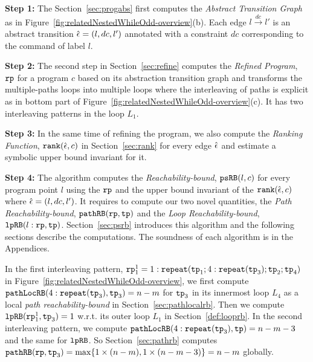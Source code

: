 \textbf{Step 1: }
The Section~\ref{sec:progabs} first 
computes the \emph{Abstract Transition Graph} as in Figure~\ref{fig:relatedNestedWhileOdd-overview}(b).
Each edge $l \xrightarrow{dc} l'$ is an abstract transition $\hat{\mathtt{\epsilon}{}} = (l, dc, l')$ annotated with a constraint $dc$ corresponding to the command of label $l$.

\textbf{Step 2: }
The second step in Section~\ref{sec:refine}
computes the \emph{Refined Program}, $\mathtt{rp}$ for a program $c$ based on 
its abstraction transition graph and transforms the multiple-paths loops
into multiple loops where
the interleaving of paths is explicit as in bottom part of Figure~\ref{fig:relatedNestedWhileOdd-overview}(c).
It has two interleaving patterns in the loop $L_1$.

\textbf{Step 3: }
In the same time of refining the program, we also compute the \emph{Ranking Function}, $\mathtt{rank}(\hat{\mathtt{\epsilon}{}}, c)$ in Section~\ref{sec:rank}
for every edge $\hat{\mathtt{\epsilon}{}}$ 
and estimate a symbolic upper bound invariant for it.

\textbf{Step 4: }
The algorithm computes the \emph{Reachability-bound}, $\mathtt{psRB}(l, c)$ for every program point $l$ using the $\mathtt{rp}$ and the upper bound invariant of the $\mathtt{rank}(\hat{\mathtt{\epsilon}{}}, c)$ where $\hat{\mathtt{\epsilon}{}} = (l,dc,l')$.
It requires to compute our two novel quantities, the \emph{Path Reachability-bound}, $\mathtt{pathRB}(\mathtt{rp}, \mathtt{tp})$ and the \emph{Loop Reachability-bound}, $\mathtt{lpRB}(l: \mathtt{rp}, \mathtt{tp})$.
Section~\ref{sec:psrb} introduces this algorithm and the following sections describe the computations. 
The soundness of each algorithm is in the Appendices.

In the first interleaving pattern, $\mathtt{rp}_1^1 = 1: \mathtt{repeat}(\mathtt{tp}_1; 4:\mathtt{repeat}(\mathtt{tp}_3); \mathtt{tp}_2; \mathtt{tp}_4)$ in Figure~\ref{fig:relatedNestedWhileOdd-overview},
we first compute $\mathtt{pathLocRB}(4:\mathtt{repeat}(\mathtt{tp}_3), \mathtt{tp}_3) = n - m$ for $\mathtt{tp}_3$ in its innermost loop $L_4$ as a local \emph{path reachability-bound} in Section~\ref{sec:pathlocalrb}.
Then we compute $\mathtt{lpRB}(\mathtt{rp}_1^1, \mathtt{tp}_3) = 1$ w.r.t. its outer loop $L_1$ in Section~\ref{def:looprb}. In the second interleaving pattern, we compute $\mathtt{pathLocRB}(4:\mathtt{repeat}(\mathtt{tp}_3), \mathtt{tp}) = n - m - 3$ and the same for $\mathtt{lpRB}$.
So Section~\ref{sec:pathrb} computes $\mathtt{pathRB}(\mathtt{rp}, \mathtt{tp}_3) = \max\{ 1 \times (n - m), 1 \times (n - m - 3) \} = n - m$ globally.

